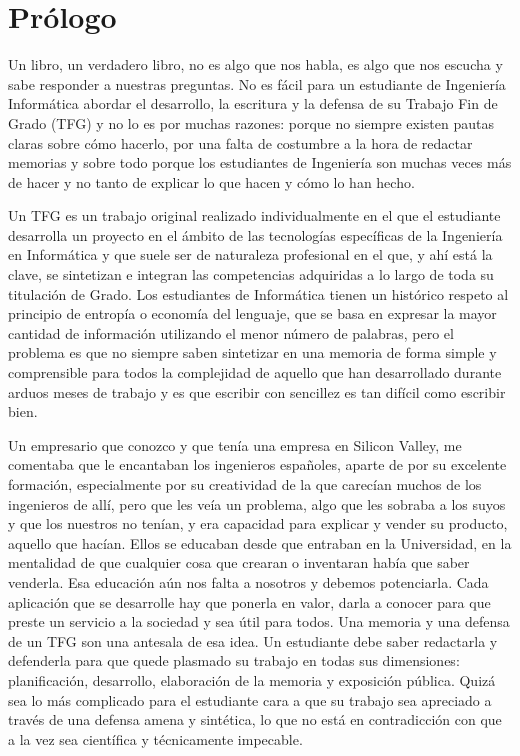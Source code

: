 \chapter*{Prólogo}

Un libro, un verdadero libro, no es algo que nos habla, es algo que nos escucha y sabe responder a nuestras preguntas. No es fácil para un estudiante de Ingeniería Informática abordar el desarrollo, la escritura y la defensa de su Trabajo Fin de Grado (TFG) y no lo es por muchas razones: porque no siempre existen pautas claras sobre cómo hacerlo, por una falta de costumbre a la hora de redactar memorias y sobre todo porque los estudiantes de Ingeniería son muchas veces más de hacer y no tanto de explicar lo que hacen y cómo lo han hecho.

Un TFG es un trabajo original realizado  individualmente en el que el estudiante desarrolla un proyecto en el ámbito de las tecnologías específicas de la Ingeniería en Informática y que suele ser de naturaleza profesional en el que, y ahí está la clave, se sintetizan e integran las competencias adquiridas a lo largo de toda su titulación de Grado. Los estudiantes de Informática tienen un histórico respeto al principio de entropía o economía del lenguaje, que se basa en expresar la mayor cantidad de información utilizando el menor número de palabras, pero el problema es que no siempre saben sintetizar en una memoria de forma simple y comprensible para todos la complejidad de aquello que han desarrollado durante arduos meses de trabajo y es que escribir con sencillez es tan difícil como escribir bien. 

Un empresario que conozco y que tenía una empresa en Silicon Valley, me comentaba que le encantaban los ingenieros españoles, aparte de por su excelente formación,  especialmente por su creatividad de la que carecían muchos de los ingenieros de allí, pero que les veía un problema, algo que les sobraba a los suyos y que los nuestros no tenían, y era capacidad para explicar y vender su producto, aquello que hacían. Ellos se educaban desde que entraban en la Universidad, en la mentalidad de que cualquier cosa que crearan o inventaran  había que saber venderla. Esa educación aún nos falta a nosotros y debemos potenciarla. Cada aplicación que se desarrolle hay que ponerla en valor, darla a conocer para que preste un servicio a la sociedad y sea útil para todos. Una memoria y una defensa de un TFG son una antesala de esa idea. Un estudiante debe saber redactarla y defenderla para que quede plasmado su trabajo en todas sus dimensiones: planificación, desarrollo, elaboración de la memoria y exposición pública. Quizá sea lo más complicado para el estudiante cara a que su trabajo sea apreciado a través de una defensa amena y sintética, lo que no está en contradicción con que a la vez sea científica y técnicamente impecable. 

